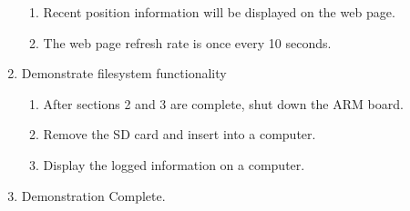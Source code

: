 \documentclass[10pt,letterpaper]{article}
\begin{document}
\begin{enumerate}
\begin{enumerate}
	\item Recent position information will be displayed on the web page.
	\item The web page refresh rate is once every 10 seconds.
	\end{enumerate}
\item Demonstrate filesystem functionality
	\begin{enumerate}
	\item After sections 2 and 3 are complete, shut down the ARM board.
	\item Remove the SD card and insert into a computer.
	\item Display the logged information on a computer.
	\end{enumerate}
\item Demonstration Complete.
\end{enumerate}
\end{document}
